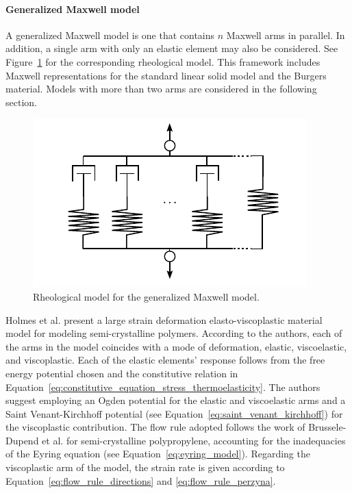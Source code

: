 \paragraph{Generalized Maxwell model}
A generalized Maxwell model is one that contains $n$ Maxwell arms in parallel.
In addition, a single arm with only an elastic element may also be considered.
See Figure~\ref{fig:rheo_model_gen_maxwell} for the corresponding rheological model.
This framework includes Maxwell representations for the standard linear solid model and the Burgers material.
Models with more than two arms are considered in the following section.
\begin{figure}[htbp]
	\centering
	\includegraphics{figures/rheo_model_gen_maxwell}
	\caption{Rheological model for the generalized Maxwell model.}
\label{fig:rheo_model_gen_maxwell}
\end{figure}

Holmes et al. \citep{holmesConstitutiveModelLarge2006} present a large strain deformation elasto-viscoplastic material model for modeling semi-crystalline polymers.
According to the authors, each of the arms in the model coincides with a mode of deformation, elastic, viscoelastic, and viscoplastic.
Each of the elastic elements' response follows from the free energy potential chosen and the constitutive relation in Equation~\eqref{eq:constitutive_equation_stress_thermoelasticity}.
The authors suggest employing an Ogden potential for the elastic and viscoelastic arms and a Saint Venant-Kirchhoff potential (see Equation~\eqref{eq:saint_venant_kirchhoff}) for the viscoplastic contribution.
The flow rule adopted follows the work of
Brussele-Dupend et al. \citep{brusselle_dupendMechanical2001, brusselle_dupendMechanical2003} for semi-crystalline polypropylene, accounting for the inadequacies of the Eyring equation (see Equation~\eqref{eq:eyring_model}).
Regarding the viscoplastic arm of the model, the strain rate is given according to Equation~\eqref{eq:flow_rule_directions} and \eqref{eq:flow_rule_perzyna}.

